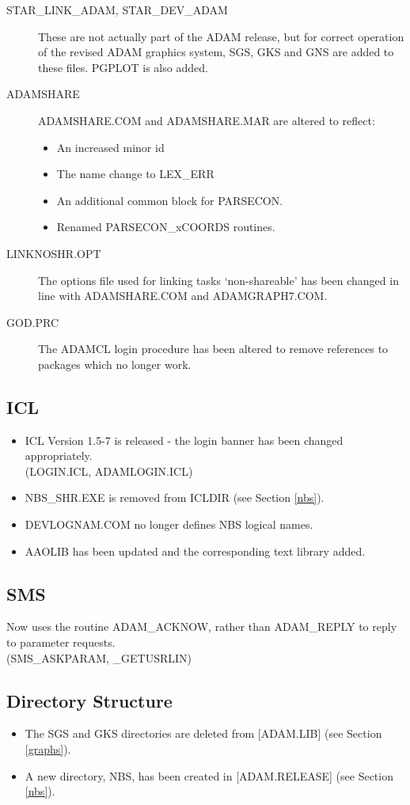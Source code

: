\begin{description}
\item[STAR\_LINK\_ADAM, STAR\_DEV\_ADAM] These are not actually part of the 
ADAM release, but for correct operation of the revised ADAM graphics system,
SGS, GKS and GNS are added to these files. PGPLOT is also added.

\item[ADAMSHARE]
ADAMSHARE.COM and ADAMSHARE.MAR are altered to reflect:
\begin{itemize}
\item An increased minor id
\item The name change to LEX\_ERR
\item An additional common block for PARSECON.
\item Renamed PARSECON\_xCOORDS routines.
\end{itemize}

\item[LINKNOSHR.OPT]
The options file used for linking tasks `non-shareable' has been changed in
line with ADAMSHARE.COM and ADAMGRAPH7.COM.

\item[GOD.PRC]
The ADAMCL login procedure has been altered to remove references to packages
which no longer work.
\end{description}

\subsection{ICL}
\begin{itemize}
\item ICL Version 1.5-7 is released - the login banner has been changed
appropriately.\\
(LOGIN.ICL, ADAMLOGIN.ICL)
\item NBS\_SHR.EXE is removed from ICLDIR (see Section \ref{nbs}).
\item DEVLOGNAM.COM no longer defines NBS logical names.
\item AAOLIB has been updated and the corresponding text library added.
\end{itemize}

\subsection{SMS}
Now uses the routine ADAM\_ACKNOW, rather than ADAM\_REPLY to reply to
parameter requests.\\
(SMS\_ASKPARAM, \_GETUSRLIN)

\subsection{Directory Structure}
\begin{itemize}
\item The SGS and GKS directories are deleted from [ADAM.LIB] (see Section 
\ref{graphs}).
\item A new directory, NBS, has been created in [ADAM.RELEASE] (see Section
\ref{nbs}).
\end{itemize}

